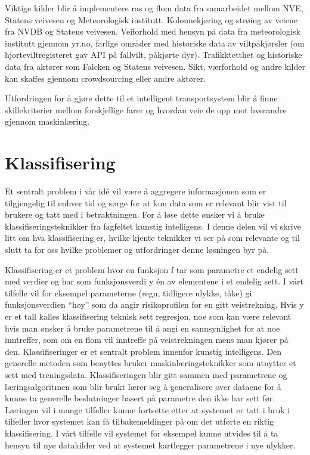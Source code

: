 \documentclass[a4paper,norsk,oneside]{book}
\begin{document}
Viktige kilder blir å implementere ras og flom data fra samarbeidet mellom NVE, Statens veivesen og Meteorologisk institutt. Kolonnekjøring og strøing av veiene fra NVDB og Statens veivesen. Veiforhold med hensyn på data fra meteorologisk institutt gjennom yr.no, farlige områder med historiske data av viltpåkjørsler (om hjorteviltregisteret gav API på fallvilt, påkjørte dyr). Trafikktetthet og historiske data fra aktører som Falcken og Statens veivesen. Sikt, værforhold og andre kilder kan skaffes gjennom crowdsourcing eller andre aktører.

Utfordringen for å gjøre dette til et intelligent transportsystem blir å finne skillekriterier mellom forskjellige farer og hvordan veie de opp mot hverandre gjennom maskinlæring.

\section{Klassifisering}
\label{sec:klassifisering}

Et sentralt problem i vår idé vil være å aggregere informasjonen som er tilgjengelig til enhver tid og sørge for at kun data som er relevant blir vist til brukere og tatt med i betraktningen.  For å løse dette ønsker vi å bruke klassifiseringsteknikker fra fagfeltet kunstig intelligens. I denne delen vil vi skrive litt om hva klassifisering er, hvilke kjente teknikker vi ser på som relevante og til slutt ta for oss hvilke problemer og utfordringer denne løsningen byr på.

Klassifisering er et problem hvor en funksjon f tar som parametre et endelig sett med verdier og har som funksjonsverdi y én av elementene i et endelig sett.\cite{norvig} I vårt tilfelle vil for eksempel parameterne (regn, tidligere ulykke, tåke) gi funksjonsverdien “høy” som da angir risikoprofilen for en gitt veistrekning. Hvis y er et tall kalles klassifisering teknisk sett regresjon, noe som kan være relevant hvis man ønsker å bruke parametrene til å angi en sannsynlighet for at noe inntreffer, som om en flom vil inntreffe på veistrekningen mens man kjører på den.
Klassifiseringer er et sentralt problem innenfor kunstig intelligens. Den generelle metoden som benyttes bruker maskinlæringsteknikker som utnytter et sett med treningsdata. Klassifiseringen blir gitt sammen med parametrene og læringsalgoritmen som blir brukt lærer seg å generalisere over dataene for å kunne ta generelle beslutninger basert på parametre den ikke har sett før. Læringen vil i mange tilfeller kunne fortsette etter at systemet er tatt i bruk i tilfeller hvor systemet kan få tilbakemeldinger på om det utførte en riktig klassifisering. I vårt tilfelle vil systemet for eksempel kunne utvides til å ta hensyn til nye datakilder ved at systemet kartlegger parametrene i nye ulykker.	
\end{document}

